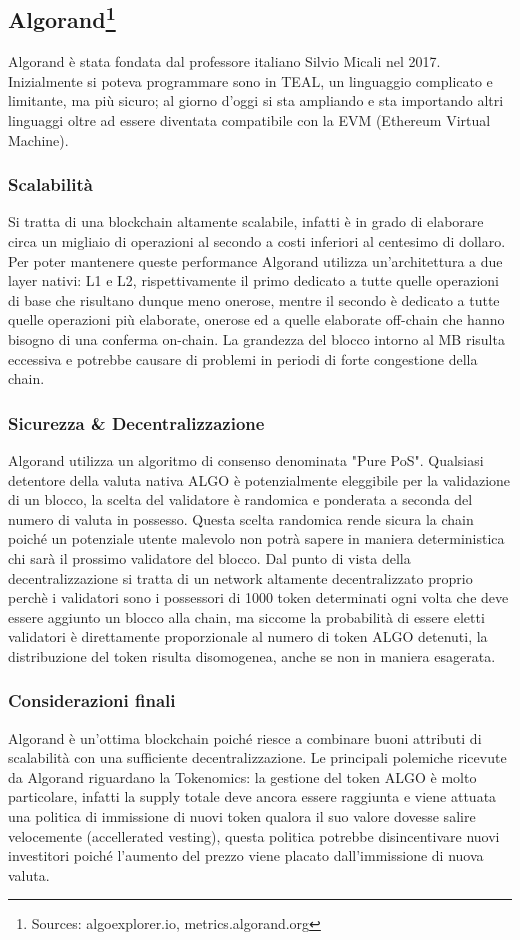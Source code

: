\documentclass[a4paper, 12pt]{article}
\begin{document}
\subsection*{Algorand\footnote{Sources: algoexplorer.io, metrics.algorand.org}}
Algorand è stata fondata dal professore italiano Silvio Micali nel 2017. Inizialmente si poteva programmare sono in TEAL, un linguaggio complicato e limitante, ma più sicuro; al giorno d'oggi si sta ampliando e sta importando altri linguaggi oltre ad essere diventata compatibile con la EVM (Ethereum Virtual Machine).
\subsubsection*{Scalabilità}
Si tratta di una blockchain altamente scalabile, infatti è in grado di elaborare circa un migliaio di operazioni al secondo a costi inferiori al centesimo di dollaro. Per poter mantenere queste performance Algorand utilizza un'architettura a due layer nativi: L1 e L2, rispettivamente il primo dedicato a tutte quelle operazioni di base che risultano dunque meno onerose, mentre il secondo è dedicato a tutte quelle operazioni più elaborate, onerose ed a quelle elaborate off-chain che hanno bisogno di una conferma on-chain. La grandezza del blocco intorno al MB risulta eccessiva e potrebbe causare di problemi in periodi di forte congestione della chain.
\subsubsection*{Sicurezza \& Decentralizzazione}
Algorand utilizza un algoritmo di consenso denominata "Pure PoS". Qualsiasi detentore della valuta nativa ALGO è potenzialmente eleggibile per la validazione di un blocco, la scelta del validatore è randomica e  ponderata a seconda del numero di valuta in possesso. Questa scelta randomica rende sicura la chain poiché un potenziale utente malevolo non potrà sapere in maniera deterministica chi sarà il prossimo validatore del blocco.
Dal punto di vista della decentralizzazione si tratta di un network altamente decentralizzato proprio perchè i validatori sono i possessori di 1000 token determinati ogni volta che deve essere aggiunto un blocco alla chain, ma siccome la probabilità di essere eletti validatori è direttamente proporzionale al numero di token ALGO detenuti, la distribuzione del token risulta disomogenea, anche se non in maniera esagerata.
\subsubsection*{Considerazioni finali}
Algorand è un'ottima blockchain poiché riesce a combinare buoni attributi di scalabilità con una sufficiente decentralizzazione. Le principali polemiche ricevute da Algorand riguardano la Tokenomics: la gestione del token ALGO è molto particolare, infatti la supply totale deve ancora essere raggiunta e viene attuata una politica di immissione di nuovi token qualora il suo valore dovesse salire velocemente (accellerated vesting), questa politica potrebbe disincentivare nuovi investitori poiché l'aumento del prezzo viene placato dall'immissione di nuova valuta.
\end{document}
